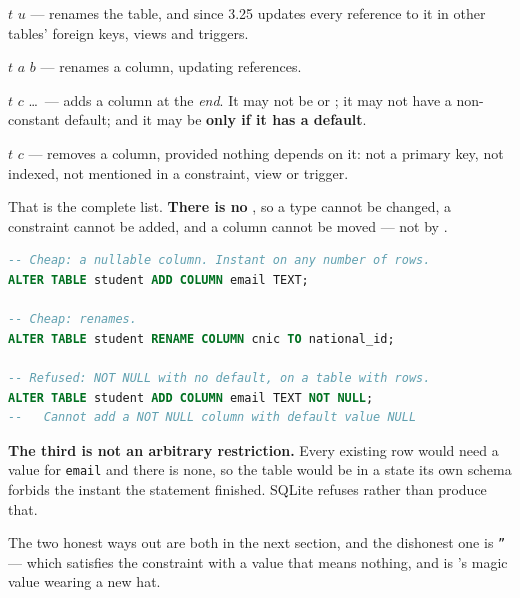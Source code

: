 \begin{definitionbox}
\begin{tight}
  \item {} $t$  $u$ --- renames the table,
        and since 3.25 updates every reference to it in other tables' foreign
        keys, views and triggers.
  \item {} $t$  $a$  $b$ ---
        renames a column, updating references.
  \item {} $t$  $c$ \dots\ --- adds a
        column at the \emph{end}. It may not be  or
        ; it may not have a non-constant default; and it may be
         \textbf{only if it has a default}.
  \item {} $t$  $c$ --- removes a column,
        provided nothing depends on it: not a primary key, not indexed, not
        mentioned in a constraint, view or trigger.
\end{tight}

\smallskip
That is the complete list. \textbf{There is no }, so a
type cannot be changed, a constraint cannot be added, and a column cannot be
moved --- not by .
\end{definitionbox}

\begin{examplebox}
\begin{lstlisting}[language=sql]
-- Cheap: a nullable column. Instant on any number of rows.
ALTER TABLE student ADD COLUMN email TEXT;

-- Cheap: renames.
ALTER TABLE student RENAME COLUMN cnic TO national_id;

-- Refused: NOT NULL with no default, on a table with rows.
ALTER TABLE student ADD COLUMN email TEXT NOT NULL;
--   Cannot add a NOT NULL column with default value NULL
\end{lstlisting}

\smallskip
\textbf{The third is not an arbitrary restriction.} Every existing row would
need a value for \texttt{email} and there is none, so the table would be in a
state its own schema forbids the instant the statement finished. SQLite
refuses rather than produce that.

\smallskip
The two honest ways out are both in the next section, and the dishonest one is
 \texttt{''} --- which satisfies the constraint with a value
that means nothing, and is 's magic value wearing a new hat.
\end{examplebox}

